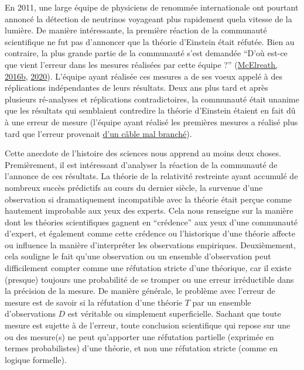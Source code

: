 \documentclass[
  a4paper,11pt,twoside,onecolumn,openright,final,oldfontcommands]{memoir}
\theoremstyle{definition}
\theoremstyle{definition}
\theoremstyle{definition}
\theoremstyle{definition}
\theoremstyle{remark}
\begin{document}
En 2011, une large équipe de physiciens de renommée internationale ont pourtant annoncé la détection de neutrinos voyageant plus rapidement quela vitesse de la lumière. De manière intéressante, la première réaction de la communauté scientifique ne fut pas d'annoncer que la théorie d'Einstein était réfutée. Bien au contraire, la plus grande partie de la communauté s'est demandée ``D'où est-ce que vient l'erreur dans les mesures réalisées par cette équipe ?'' (\protect\hyperlink{ref-mcelreath_statistical_2016}{McElreath, 2016b}, \protect\hyperlink{ref-mcelreath_statistical_2020}{2020}). L'équipe ayant réalisée ces mesures a de ses voeux appelé à des réplications indépendantes de leurs résultats. Deux ans plus tard et après plusieurs ré-analyses et réplications contradictoires, la communauté était unanime que les résultats qui semblaient contredire la théorie d'Einstein étaient en fait dû à une erreur de mesure (l'équipe ayant réalisé les premières mesures a réalisé plus tard que l'erreur provenait \href{https://profmattstrassler.com/articles-and-posts/particle-physics-basics/neutrinos/neutrinos-faster-than-light/opera-what-went-wrong/}{d'un câble mal branché}).

Cette anecdote de l'histoire des sciences nous apprend au moins deux choses. Premièrement, il est intéressant d'analyser la réaction de la communauté de l'annonce de ces résultats. La théorie de la relativité restreinte ayant accumulé de nombreux succès prédictifs au cours du dernier siècle, la survenue d'une observation si dramatiquement incompatible avec la théorie était perçue comme hautement improbable aux yeux des experts. Cela nous renseigne sur la manière dont les théories scientifiques gagnent en ``crédence'' aux yeux d'une communauté d'expert, et également comme cette crédence ou l'historique d'une théorie affecte ou influence la manière d'interpréter les observations empiriques. Deuxièmement, cela souligne le fait qu'une observation ou un ensemble d'observation peut difficilement compter comme une réfutation stricte d'une théorique, car il existe (presque) toujours une probabilité de se tromper ou une erreur irréductible dans la précision de la mesure. De manière générale, le problème avec l'erreur de mesure est de savoir si la réfutation d'une théorie \(T\) par un ensemble d'observations \(D\) est véritable ou simplement superficielle. Sachant que toute mesure est sujette à de l'erreur, toute conclusion scientifique qui repose sur une ou des mesure(s) ne peut qu'apporter une réfutation partielle (exprimée en termes probabilistes) d'une théorie, et non une réfutation stricte (comme en logique formelle).
\end{document}
